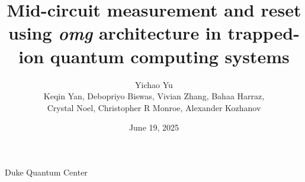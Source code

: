 \documentclass{beamer}
\title[MCMR with \textit{omg}]{Mid-circuit measurement and reset using \textit{omg} architecture in trapped-ion quantum computing systems}
\date{June 19, 2025}
\author[Yichao Yu]{Yichao Yu\\
  \vspace{0.5cm}
  {\footnotesize Keqin Yan, Debopriyo Biswas, Vivian Zhang, Bahaa Harraz,}\\
  {\footnotesize Crystal Noel, Christopher R Monroe, Alexander Kozhanov}}
\institute[Duke Quantum Center]{Monroe Group/Duke Quantum Center}
\begin{document}


{
  \begin{frame}{}
    \titlepage
  \end{frame}
}


\begin{frame}{Duke Quantum Center}
\end{frame}


\end{document}
